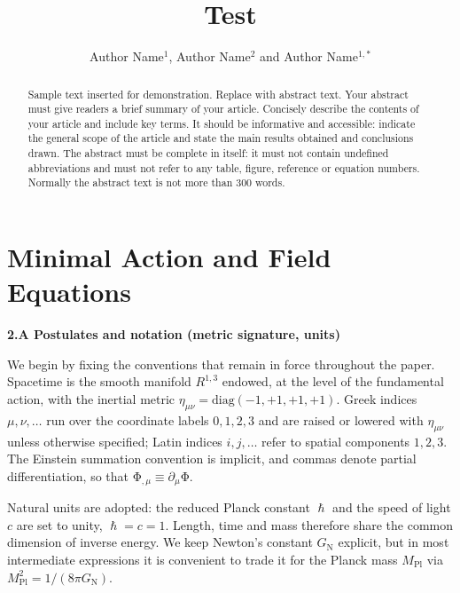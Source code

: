 \documentclass{iopjournal}
\begin{document}

\title{Test}

\author{Author Name$^1$, Author Name$^2$ and Author Name$^{1,*}$}






\begin{abstract}
Sample text inserted for demonstration. Replace with abstract text. Your abstract must give readers a brief summary of your article. Concisely describe the contents of your article and include key terms. It should be informative and accessible: indicate the general scope of the article and state the main results obtained and conclusions drawn. The abstract must be complete in itself: it must not contain undefined abbreviations and must not refer to any table, figure, reference or equation numbers. Normally the abstract text is not more than 300 words.
\end{abstract}


\setcounter{section}{1}
\section{Minimal Action and Field Equations}

\stop

\textbf{2.A Postulates and notation (metric signature, units)}

We begin by fixing the conventions that remain in force throughout the paper. Spacetime is the smooth manifold $R^{\mathrm{1},\mathrm{3}}$ endowed, at the level of the fundamental action, with the inertial metric ${\eta }_{\mu \nu }=\mathrm{diag}\left(-1,+1,+1,+1\right)$. Greek indices $\mu ,\nu ,\mathrm{\dots }$ run over the coordinate labels $0,1,2,3$ and are raised or lowered with ${\eta }_{\mu \nu }$ unless otherwise specified; Latin indices $i,j,\mathrm{\dots }$ refer to spatial components $1,2,3$. The Einstein summation convention is implicit, and commas denote partial differentiation, so that ${\mathrm{\Phi }}_{,\mu }≡{\partial }_{\mu }\mathrm{\Phi }$.

Natural units are adopted: the reduced Planck constant $\mathrm{\hslash }$ and the speed of light $c$ are set to unity, $\mathrm{\hslash }=c=1$. Length, time and mass therefore share the common dimension of inverse energy. We keep Newton's constant $G_{\mathrm{N}}$ explicit, but in most intermediate expressions it is convenient to trade it for the Planck mass $M_{\mathrm{Pl}}$ via $M^2_{\mathrm{Pl}}=1/\left(8\pi G_{\mathrm{N}}\right)$.
\end{document}
